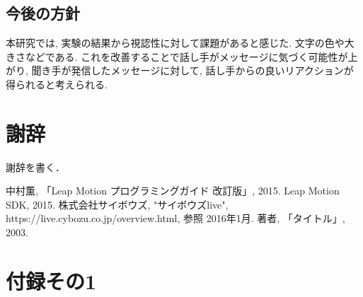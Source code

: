 \documentclass{funthesis}
\begin{document}

\section{今後の方針}
本研究では, 実験の結果から視認性に対して課題があると感じた. 文字の色や大きさなどである. これを改善することで話し手がメッセージに気づく可能性が上がり, 聞き手が発信したメッセージに対して, 話し手からの良いリアクションが得られると考えられる. 



\chapter*{謝辞}

謝辞を書く．


\begin{thebibliography}{9}
  中村薫, 「Leap Motion プログラミングガイド 改訂版」, 2015.
   Leap Motion SDK, 2015.
  株式会社サイボウズ, "サイボウズlive", https://live.cybozu.co.jp/overview.html, 参照 2016年1月.
  著者, 「タイトル」, 2003.
\end{thebibliography}





\appendix

\chapter*{付録その1} %
\end{document}
